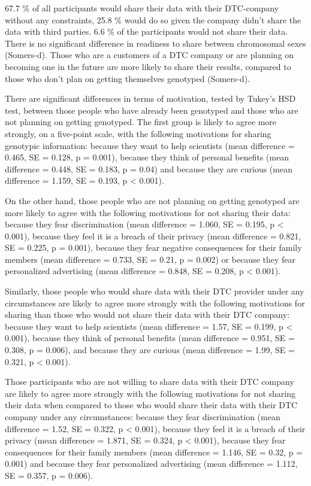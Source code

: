\documentclass[10pt]{article}
\begin{document}
67.7 \% of all participants would share their data with their DTC-company without any constraints, 25.8 \% would do so given the company didn't share the data with third parties. 6.6 \% of the participants would not share their data. There is no significant difference in readiness to share between chromosomal sexes (Somers-d). Those who are a customers of a DTC company or are planning on becoming one in the future are more likely to share their results, compared to those who don't plan on getting themselves genotyped (Somers-d). 

There are significant differences in terms of motivation, tested by Tukey's HSD test, between those people who have already been genotyped and those who are not planning on getting genotyped. The first group is likely to agree more strongly, on a five-point scale, with the following motivations for sharing genotypic information: because they want to help scientists (mean difference = 0.465, SE = 0.128, p = 0.001), because they think of personal benefits (mean difference = 0.448, SE = 0.183, p = 0.04) and because they are curious (mean difference = 1.159, SE = 0.193, p < 0.001). 

On the other hand, those people who are not planning on getting genotyped are more likely to agree with the following motivations for not sharing their data: because they fear discrimination (mean difference = 1.060, SE = 0.195, p < 0.001), because they feel it is a breach of their privacy (mean difference = 0.821, SE = 0.225, p = 0.001), because they fear negative consequences for their family members (mean difference = 0.733, SE = 0.21, p = 0.002) or because they fear personalized advertising (mean difference = 0.848, SE = 0.208, p < 0.001).

Similarly, those people who would share data with their DTC provider under any circumstances are likely to agree more strongly with the following motivations for sharing than those who would not share their data with their DTC company: because they want to help scientists (mean difference = 1.57, SE = 0.199, p < 0.001), because they think of personal benefits (mean difference = 0.951, SE = 0.308, p = 0.006), and because they are curious (mean difference = 1.99, SE = 0.321, p < 0.001). 

Those participants who are not willing to share data with their DTC company are likely to agree more strongly with the following motivations for not sharing their data when compared to those who would share their data with their DTC company under any circumstances: because they fear discrimination (mean difference = 1.52, SE = 0.322, p < 0.001), because they feel it is a breach of their privacy (mean difference = 1.871, SE = 0.324, p < 0.001), because they fear consequences for their family members (mean difference = 1.146, SE = 0.32, p = 0.001) and because they fear personalized advertising (mean difference =  1.112, SE = 0.357, p = 0.006). 
\end{document}
